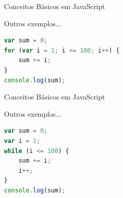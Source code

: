 \documentclass[xcolor=dvipsnames,table]{beamer}
\begin{document}
\begin{frame}[fragile]{Conceitos Básicos em JavaScript}
	\begin{block}{Outros exemplos...}
	\begin{lstlisting}[language=JavaScript]
var sum = 0;
for (var i = 1; i <= 100; i++) {
	sum += i;
}
console.log(sum);
\end{lstlisting}	
\end{block}
\end{frame}

\begin{frame}[fragile]{Conceitos Básicos em JavaScript}
	\begin{block}{Outros exemplos...}
		\begin{lstlisting}[language=JavaScript]
var sum = 0;
var i = 1;
while (i <= 100) {
	sum += i;
	i++;
}
console.log(sum);
\end{lstlisting}	
	\end{block}
\end{frame}
	
	\begin{frame}
		\titlepage
	\end{frame}
	
\end{document}
